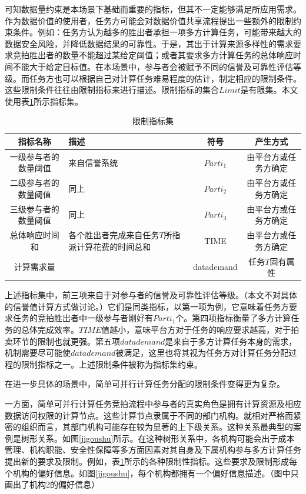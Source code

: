 \documentclass[promaster]{thesis-uestc}
\begin{document}
可知数据量约束是本场景下基础而重要的指标，但其不一定能够满足所应用需求。作为数据价值的使用者，任务方可能会对数据价值共享流程提出一些额外的限制约束条件。例如：任务方认为越多的胜出者承担一项多方计算任务，可能带来越大的数据安全风险，并降低数据结果的可靠性。于是，其出于计算来源多样性的需求要求竞拍胜出者的数量不能超过某给定阈值；或者其要求多方计算任务的总体响应时间不能大于给定目标值。在本场景中，参与者会被赋予不同的信誉及可靠性评估等级。而任务方也可以根据自己对计算任务难易程度的估计，制定相应的限制条件。这些限制条件往往由限制指标来进行描述。限制指标的集合$Limit$是有限集。本文使用表\ref{zhibiao}所示指标集。

\begin{table}[h]
\caption{限制指标集}
\label{zhibiao}
\begin{tabular}{cp{10em}cc}
    \toprule
    指标名称& 描述&符号&产生方式\\
    \midrule
    一级参与者的数量阈值&来自信誉系统&$Parti_1$&由平台方或任务方确定\\
    二级参与者的数量阈值& 同上&$Parti_2$&由平台方或任务方确定\\
    三级参与者的数量阈值& 同上&$Parti_3$&由平台方或任务方确定\\
    总体响应时间和&各个胜出者完成来自任务$T$所指派计算花费的时间总和&TIME&由平台方或任务方确定\\
    计算需求量&&datademand&任务$T$固有属性\\
    \bottomrule
\end{tabular}
\end{table}

上述指标集中，前三项来自于对参与者的信誉及可靠性评估等级。（本文不对具体的信誉值计算方式做讨论。）它们是同类指标，以第一项为例，它意味着任务方要求任务的竞拍胜出者中一级参与者刚好有$Parti_1$个。第四项指标衡量了多方计算任务的总体完成效率。$TIME$值越小，意味平台方对于任务的响应要求越高，对于拍卖环节的限制也就更强。第五项$datademand$是来自于多方计算任务本身的需求，机制需要尽可能使$datademand$被满足，这里也将其视为任务方对计算任务分配过程的限制指标之一。上述限制条件被称为指标集约束。

在进一步具体的场景中，简单可并行计算任务分配的限制条件变得更为复杂。

一方面，简单可并行计算任务竞拍流程中参与者的真实角色是拥有计算资源及相应数据访问权限的计算节点。这些计算节点隶属于不同的部门机构。就相对严格而紧密的组织而言，其部门机构可能存在较为显著的上下级关系。这种关系最典型的案例是树形关系。如图\ref{jigoushu}所示。在这种树形关系中，各机构可能会出于成本管理、机构职能、安全性保障等多方面因素对其自身及下属机构参与多方计算任务提出新的要求及限制。例如，表\ref{zhibiao}所示的各种限制性指标。这些要求及限制形成每个机构的偏好信息。如图\ref{jigoushu}，每个机构都拥有一个偏好信息描述。（图中只画出了机构2的偏好信息）
\end{document}
